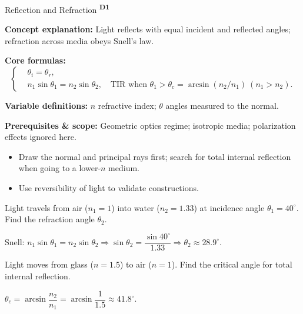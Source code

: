 ﻿\documentclass[12pt,a4paper]{article}
\providecommand{\KPFormulas}{}
\providecommand{\KPHeuristics}{}
\providecommand{\KPProblems}{}
\newcommand{\DOne}{\texorpdfstring{\textsuperscript{\textbf{D1}}}{ D1}}
\begin{document}
\begin{KnowledgePoint}{Reflection and Refraction \DOne}
  \KPFormulas
  \begin{formulabox}
  \textbf{Concept explanation:} Light reflects with equal incident and reflected angles; refraction across media obeys Snell's law.

  \textbf{Core formulas:}
  \[
  \left\{\begin{aligned}
    &\theta_i=\theta_r,\\
    &n_1\sin\theta_1=n_2\sin\theta_2,\quad \text{TIR when }\theta_1>\theta_c=\arcsin(n_2/n_1)\ (n_1>n_2).
  \end{aligned}\right.
  \]

  \textbf{Variable definitions:} $n$ refractive index; $\theta$ angles measured to the normal.

  \textbf{Prerequisites \& scope:} Geometric optics regime; isotropic media; polarization effects ignored here.
  \end{formulabox}

  \KPHeuristics
  \begin{heuristicsbox}
  \begin{itemize}[leftmargin=*]
    \item Draw the normal and principal rays first; search for total internal reflection when going to a lower-$n$ medium.
    \item Use reversibility of light to validate constructions.
  \end{itemize}
  \end{heuristicsbox}

  \KPProblems
\begin{cheatproblem}
  Light travels from air ($n_1=1$) into water ($n_2=1.33$) at incidence angle $\theta_1=40^\circ$. Find the refraction angle $\theta_2$.
\begin{solutionbox}
  Snell: $n_1\sin\theta_1=n_2\sin\theta_2\Rightarrow\sin\theta_2=\dfrac{\sin40^\circ}{1.33}\Rightarrow\theta_2\approx28.9^\circ$.
\end{solutionbox}
\end{cheatproblem}
\begin{cheatproblem}
  Light moves from glass ($n=1.5$) to air ($n=1$). Find the critical angle for total internal reflection.
\begin{solutionbox}
  $\theta_c=\arcsin\dfrac{n_2}{n_1}=\arcsin\dfrac{1}{1.5}\approx41.8^\circ$.
\end{solutionbox}
\end{cheatproblem}
\end{KnowledgePoint}
\end{document}
